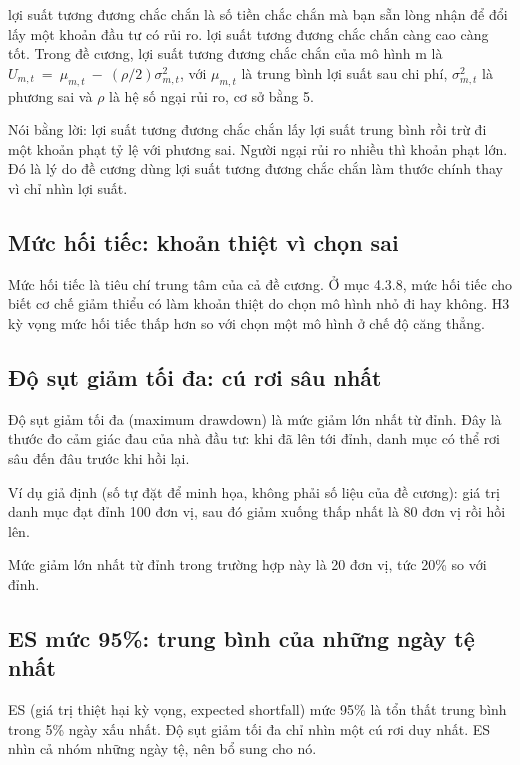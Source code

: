 lợi suất tương đương chắc chắn là số tiền chắc chắn mà bạn sẵn lòng nhận để đổi lấy một khoản đầu tư có rủi ro. lợi suất tương đương chắc chắn càng cao càng tốt. Trong đề cương, lợi suất tương đương chắc chắn của mô hình m là \(U_{m,t}\  = \ \mu_{m,t}\  - \ (\rho/2)\sigma_{m,t}^{2}\), với \(\mu_{m,t}\) là trung bình lợi suất sau chi phí, \(\sigma_{m,t}^{2}\) là phương sai và \(\rho\) là hệ số ngại rủi ro, cơ sở bằng 5.

Nói bằng lời: lợi suất tương đương chắc chắn lấy lợi suất trung bình rồi trừ đi một khoản phạt tỷ lệ với phương sai. Người ngại rủi ro nhiều thì khoản phạt lớn. Đó là lý do đề cương dùng lợi suất tương đương chắc chắn làm thước chính thay vì chỉ nhìn lợi suất.

\subsection{Mức hối tiếc: khoản thiệt vì chọn sai}

Mức hối tiếc là tiêu chí trung tâm của cả đề cương. Ở mục 4.3.8, mức hối tiếc cho biết cơ chế giảm thiểu có làm khoản thiệt do chọn mô hình nhỏ đi hay không. H3 kỳ vọng mức hối tiếc thấp hơn so với chọn một mô hình ở chế độ căng thẳng.

\subsection{Độ sụt giảm tối đa: cú rơi sâu nhất}

Độ sụt giảm tối đa (maximum drawdown) là mức giảm lớn nhất từ đỉnh. Đây là thước đo cảm giác đau của nhà đầu tư: khi đã lên tới đỉnh, danh mục có thể rơi sâu đến đâu trước khi hồi lại.

\begin{tcolorbox}[breakable]
Ví dụ giả định (số tự đặt để minh họa, không phải số liệu của đề cương): giá trị danh mục đạt đỉnh 100 đơn vị, sau đó giảm xuống thấp nhất là 80 đơn vị rồi hồi lên.

Mức giảm lớn nhất từ đỉnh trong trường hợp này là 20 đơn vị, tức 20\% so với đỉnh.
\end{tcolorbox}

\subsection{ES mức 95\%: trung bình của những ngày tệ nhất}

ES (giá trị thiệt hại kỳ vọng, expected shortfall) mức 95\% là tổn thất trung bình trong 5\% ngày xấu nhất. Độ sụt giảm tối đa chỉ nhìn một cú rơi duy nhất. ES nhìn cả nhóm những ngày tệ, nên bổ sung cho nó.

